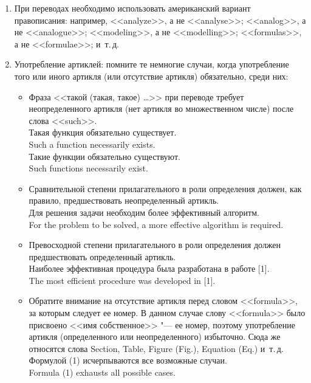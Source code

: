 \documentclass[a5paper, 10pt, twoside, numbers=enddot]{scrartcl}
\newcommand{\etc}{и~т.\,д.\xspace}
\begin{document}
\begin{enumerate}
  \item При переводах необходимо использовать американский вариант правописания: например,
    <<analyze>>, а не <<analyse>>; <<analog>>, а не <<analogue>>; <<modeling>>, а не <<modelling>>;
    <<formulas>>, а не <<formulae>>; \etc

  \item Употребление артиклей: помните те немногие случаи, когда употребление того или иного артикля
    (или отсутствие артикля) обязательно, среди них:
    \begin{itemize}
      \item Фраза <<такой (такая, такое) \ldots>> при переводе требует неопределенного артикля (нет
        артикля во множественном числе) после слова <<such>>.\\ [4pt]
        \textsf{
          Такая функция обязательно существует.\\
          Such a function necessarily exists.\\ [4pt]
          Такие функции обязательно существуют.\\
          Such functions necessarily exist.
        }

      \item Сравнительной степени прилагательного в роли определения должен, как правило,
        предшествовать неопределенный артикль.\\ [4pt]
        \textsf{
          Для решения задачи необходим более эффективный алгоритм.\\
          For the problem to be solved, a more effective algorithm is required.
        }

      \item Превосходной степени прилагательного в роли определения должен предшествовать
        определенный артикль.\\ [4pt]
        \textsf{
          Наиболее эффективная процедура была разработана в работе [1].\\
          The most efficient procedure was developed in [1].
        }

      \item Обратите внимание на отсутствие артикля перед словом <<formula>>, за которым следует ее
        номер. В данном случае слову <<formula>> было присвоено <<имя собственное>> "--- ее номер,
        поэтому употребление артикля (определенного или неопределенного) избыточно. Сюда же
        относятся слова Section, Table, Figure (Fig.), Equation (Eq.) \etc\\ [4pt]
        \textsf{
          Формулой (1) исчерпываются все возможные случаи.\\
          Formula (1) exhausts all possible cases.
        }


\end{itemize}
\end{enumerate}
\end{document}
